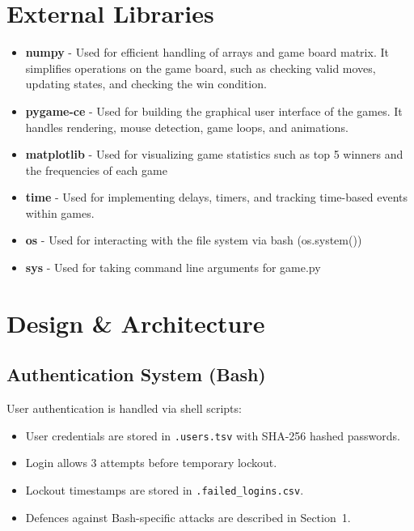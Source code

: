 \documentclass[12pt]{article}
\begin{document}
\clearpage
\section{External Libraries}
\begin{itemize}
\item \textbf{numpy} - Used for efficient handling of arrays and game board matrix. It simplifies operations on the game board, such as checking valid moves, updating states, and checking the win condition.

\item \textbf{pygame-ce} - Used for building the graphical user interface of the games. It handles rendering, mouse detection, game loops, and animations.

\item \textbf{matplotlib} - Used for visualizing game statistics such as top 5 winners and the frequencies of each game

\item \textbf{time} - Used for implementing delays, timers, and tracking time-based events within games.

\item \textbf{os} - Used for interacting with the file system via bash (os.system())

\item \textbf{sys} - Used for taking command line arguments for game.py 
\end{itemize}

\section{Design \& Architecture}

\subsection{Authentication System (Bash)}
User authentication is handled via shell scripts:
\begin{itemize}
    \item User credentials are stored in \texttt{.users.tsv} with SHA-256 hashed passwords.
    \item Login allows 3 attempts before temporary lockout.
    \item Lockout timestamps are stored in \texttt{.failed\_logins.csv}.
    \item Defences against Bash-specific attacks are described in Section~1.
\end{itemize}
\end{document}
